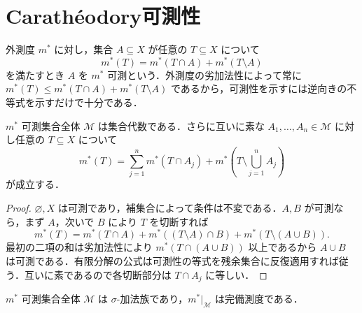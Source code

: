 \section{Carathéodory可測性}
\begin{defn}[外測度に関する可測集合]
外測度 $m^*$ に対し，集合 $A\subseteq X$ が任意の $T\subseteq X$ について
\[
 m^*(T)=m^*(T\cap A)+m^*(T\setminus A)
\]
を満たすとき $A$ を $m^*$ 可測という．外測度の劣加法性によって常に $m^*(T)\leq m^*(T\cap A)+m^*(T\setminus A)$ であるから，可測性を示すには逆向きの不等式を示すだけで十分である．
\end{defn}
\begin{prop}[外測度可測集合の有限演算]
$m^*$ 可測集合全体 $\mathcal M$ は集合代数である．さらに互いに素な $A_1,\ldots,A_n\in\mathcal M$ に対し任意の $T\subseteq X$ について
\[
 m^*(T)=\sum_{j=1}^n m^*(T\cap A_j)+m^*(T\setminus\bigcup_{j=1}^n A_j)
\]
が成立する．
\end{prop}
\begin{proof}
$\varnothing,X$ は可測であり，補集合によって条件は不変である．$A,B$ が可測なら，まず $A$，次いで $B$ により $T$ を切断すれば
\[
 m^*(T)=m^*(T\cap A)+m^*((T\setminus A)\cap B)+m^*(T\setminus(A\cup B)).
\]
最初の二項の和は劣加法性により $m^*(T\cap(A\cup B))$ 以上であるから $A\cup B$ は可測である．有限分解の公式は可測性の等式を残余集合に反復適用すれば従う．互いに素であるので各切断部分は $T\cap A_j$ に等しい．
\end{proof}
\begin{prop}[Carathéodoryの定理]
$m^*$ 可測集合全体 $\mathcal M$ は $\sigma$-加法族であり，$m^*|_{\mathcal M}$ は完備測度である．
\end{prop}
